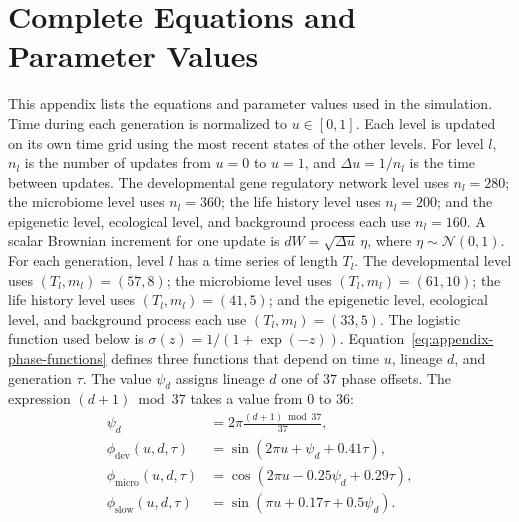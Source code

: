 \documentclass[11pt]{article}
\begin{document}
\appendix
\section{Complete Equations and Parameter Values}
This appendix lists the equations and parameter values used in the simulation. Time during each generation is normalized to $u\in[0,1]$. Each level is updated on its own time grid using the most recent states of the other levels. For level $l$, $n_l$ is the number of updates from $u=0$ to $u=1$, and $\Delta u=1/n_l$ is the time between updates. The developmental gene regulatory network level uses $n_l=280$; the microbiome level uses $n_l=360$; the life history level uses $n_l=200$; and the epigenetic level, ecological level, and background process each use $n_l=160$. A scalar Brownian increment for one update is $dW=\sqrt{\Delta u}\,\eta$, where $\eta\sim\mathcal{N}(0,1)$. For each generation, level $l$ has a time series of length $T_l$. The developmental level uses $(T_l,m_l)=(57,8)$; the microbiome level uses $(T_l,m_l)=(61,10)$; the life history level uses $(T_l,m_l)=(41,5)$; and the epigenetic level, ecological level, and background process each use $(T_l,m_l)=(33,5)$. The logistic function used below is $\sigma(z)=1/(1+\exp(-z))$. Equation~\ref{eq:appendix-phase-functions} defines three functions that depend on time $u$, lineage $d$, and generation $\tau$. The value $\psi_d$ assigns lineage $d$ one of $37$ phase offsets. The expression $(d+1)\bmod 37$ takes a value from $0$ to $36$:
\begin{equation}
\begin{aligned}
\psi_d
&=
2\pi\frac{(d+1)\bmod 37}{37},
\\
\phi_{\mathrm{dev}}(u,d,\tau)
&=
\sin(2\pi u+\psi_d+0.41\tau),
\\
\phi_{\mathrm{micro}}(u,d,\tau)
&=
\cos(2\pi u-0.25\psi_d+0.29\tau),
\\
\phi_{\mathrm{slow}}(u,d,\tau)
&=
\sin(\pi u+0.17\tau+0.5\psi_d).
\end{aligned}
\label{eq:appendix-phase-functions}
\end{equation}
\end{document}
